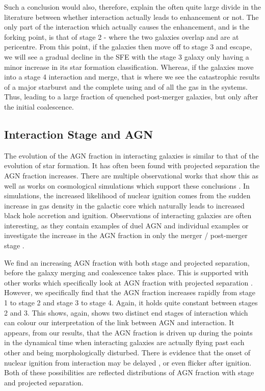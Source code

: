 \documentclass[fleqn,usenatbib]{mnras}
\begin{document}
Such a conclusion would also, therefore, explain the often quite large divide in the literature between whether interaction actually leads to enhancement or not. The only part of the interaction which actually causes the enhancement, and is the forking point, is that of stage 2 - where the two galaxies overlap and are at pericentre. From this point, if the galaxies then move off to stage 3 and escape, we will see a gradual decline in the SFE with the stage 3 galaxy only having a minor increase in its star formation classification. Whereas, if the galaxies move into a stage 4 interaction and merge, that is where we see the catastrophic results of a major starburst and the complete using and of all the gas in the systems. Thus, leading to a large fraction of quenched post-merger galaxies, but only after the initial coalescence. 

\subsection{Interaction Stage and AGN}
\noindent The evolution of the AGN fraction in interacting galaxies is similar to that of the evolution of star formation. It has often been found with projected separation the AGN fraction increases. There are multiple observational works that show this \citep{2007MNRAS.375.1017A, 2013MNRAS.435.3627E, 2020ApJ...904..107S} as well as works on cosmological simulations which support these conclusions \citep{2023MNRAS.519.4966B}. In simulations, the increased likelihood of nuclear ignition comes from the sudden increase in gas density in the galactic core which naturally leads to increased black hole accretion and ignition. Observations of interacting galaxies are often interesting, as they contain examples of duel AGN and individual examples \citep[e.g.][]{2017MNRAS.470L..49E, 2021ApJ...923...36S} or investigate the increase in the AGN fraction in only the merger / post-merger stage \citep{2020A&A...637A..94G}.

We find an increasing AGN fraction with both stage and projected separation, before the galaxy merging and coalescence takes place. This is supported with other works which specifically look at AGN fraction with projected separation \citep{2011MNRAS.418.2043E, 2023ApJ...942..107S}. However, we specifically find that the AGN fraction increases rapidly from stage 1 to stage 2 and stage 3 to stage 4. Again, it holds quite constant between stages 2 and 3. This shows, again, shows two distinct end stages of interaction which can colour our interpretation of the link between AGN and interaction. It appears, from our results, that the AGN fraction is driven up during the points in the dynamical time when interacting galaxies are actually flying past each other and being morphologically disturbed. There is evidence that the onset of nuclear ignition from interaction may be delayed \citep{2011MNRAS.418.2043E}, or even flicker \citep{2015MNRAS.451.2517S} after ignition. Both of these possibilities are reflected distributions of AGN fraction with stage and projected separation.
\end{document}
